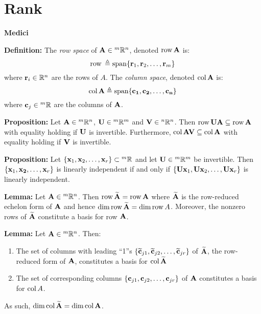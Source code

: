 \documentclass{article}
\begin{document}
    \section{Rank}
    \begin{minipage}[t]{.45\textwidth} %
        \begin{center}
            \textbf{Medici}
        \end{center}
        \textbf{Definition:} The \textit{row space} of $\mathbf{A} \in {^m}\mathbb{R}^n$, denoted $\mathrm{row}\,\mathbf{A}$ is:
        \begin{equation*}
            \mathrm{row}\,\triangleq \mathrm{span}\{\mathbf{r}_1,\mathbf{r}_2,\dots,\mathbf{r}_m\}
        \end{equation*}
        where $\mathbf{r}_i \in \mathbb{R}^n$ are the rows of $A$. The \textit{column space}, denoted $\mathrm{col}\,\mathbf{A}$ is:
        \begin{equation*}
            \mathrm{col}\,\bf{A} \triangleq \mathrm{span}\{\mathbf{c}_1,\mathbf{c}_2,\dots,\mathbf{c}_n\}
        \end{equation*}
        where $\mathbf{c}_j \in {^m}\mathbb{R}$ are the columns of $\mathbf{A}$.
        \vspace{2mm}

        \textbf{Proposition:} Let $\mathbf{A} \in {^m}\mathbb{R}^n$, $\mathbf{U} \in {^m}\mathbb{R}^m$ and $\mathbf{V} \in {^n}\mathbb{R}^n$. Then $\mathrm{row}\,\mathbf{UA} \subseteq \mathrm{row}\,\mathbf{A}$ with equality holding if $\mathbf{U}$ is invertible. Furthermore, $\mathrm{col}\,\mathbf{AV} \subseteq \mathrm{col}\,\mathbf{A}$ with equality holding if $\mathbf{V}$ is invertible.
        \vspace{2mm}

        \textbf{Proposition:} Let $\{\mathbf{x}_1, \mathbf{x}_2, \dots, \mathbf{x}_r\} \subset {^m}\mathbb{R}$ and let $\mathbf{U} \in {^m}\mathbb{R}^m$ be invertible. Then $\{\mathbf{x}_1,\mathbf{x_2},\dots,\mathbf{x}_r\}$ is linearly independent if and only if $\{\mathbf{Ux}_1,\mathbf{Ux}_2,\dots,\mathbf{Ux}_r\}$ is linearly independent.
        \vspace{2mm}

        \textbf{Lemma:} Let $\mathbf{A} \in {^m}\mathbb{R}^n$. Then $\mathrm{row}\,\widetilde{\mathbf{A}} = \mathrm{row}\,\mathbf{A}$ where $\widetilde{\mathbf{A}}$ is the row-reduced echelon form of $\mathbf{A}$ and hence $\dim \mathrm{row}\,\widetilde{\mathbf{A}} = \dim \mathrm{row}\,A$. Moreover, the nonzero rows of $\widetilde{\mathbf{A}}$ constitute a basis for row $\mathbf{A}$.
        \vspace{2mm}
        
        \textbf{Lemma:} Let $\mathbf{A} \in {^m}\mathbb{R}^n$. Then:
        \begin{enumerate}
            \item The set of columns with leading ``1''s $\{\widetilde{\mathbf{c}}_{j1}, \widetilde{\mathbf{c}}_{j2},\dots, \widetilde{\mathbf{c}}_{jr}\}$ of $\widetilde{\mathbf{A}}$, the row-reduced form of $\mathbf{A}$, constitutes a basis for $\mathrm{col}\,\widetilde{\mathbf{A}}$
            \item The set of corresponding columns $\{\mathbf{c}_{j1},\mathbf{c}_{j2},\dots,\mathbf{c}_{jr}\}$ of $\mathbf{A}$ constitutes a basis for $\mathrm{col}\,A$.
        \end{enumerate}
        As such, $\dim \mathrm{col}\,\widetilde{\mathbf{A}} = \dim \mathrm{col}\,\mathbf{A}$.
        \vspace{2mm}
        

\end{minipage}
\end{document}

